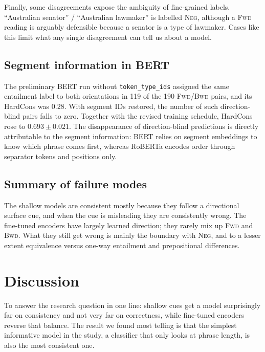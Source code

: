 \documentclass[11pt,a4paper]{article}
\newcommand{\FWD}{\textsc{Fwd}}
\newcommand{\BWD}{\textsc{Bwd}}
\newcommand{\NEG}{\textsc{Neg}}
\begin{document}
Finally, some disagreements expose the ambiguity of fine-grained labels. ``Australian senator'' / ``Australian lawmaker'' is labelled \NEG{}, although a \FWD{} reading is arguably defensible because a senator is a type of lawmaker. Cases like this limit what any single disagreement can tell us about a model.

\subsection{Segment information in BERT}
The preliminary BERT run without \texttt{token\_type\_ids} assigned the same entailment label to both orientations in 119 of the 190 \FWD/\BWD{} pairs, and its HardCons was 0.28. With segment IDs restored, the number of such direction-blind pairs falls to zero. Together with the revised training schedule, HardCons rose to $0.693\pm0.021$. The disappearance of direction-blind predictions is directly attributable to the segment information: BERT relies on segment embeddings to know which phrase comes first, whereas RoBERTa encodes order through separator tokens and positions only.

\subsection{Summary of failure modes}
The shallow models are consistent mostly because they follow a directional surface cue, and when the cue is misleading they are consistently wrong. The fine-tuned encoders have largely learned direction; they rarely mix up \FWD{} and \BWD{}. What they still get wrong is mainly the boundary with \NEG{}, and to a lesser extent equivalence versus one-way entailment and prepositional differences.

\section{Discussion}
\label{sec:discussion}

To answer the research question in one line: shallow cues get a model surprisingly far on consistency and not very far on correctness, while fine-tuned encoders reverse that balance. The result we found most telling is that the simplest informative model in the study, a classifier that only looks at phrase length, is also the most consistent one.
\end{document}
